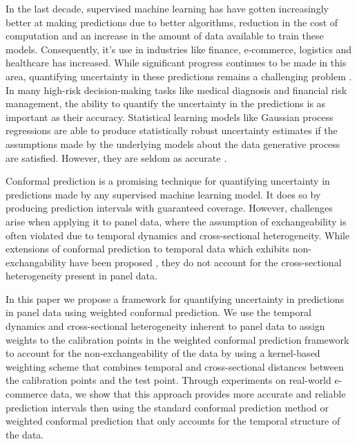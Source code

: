 
In the last decade, supervised machine learning has have gotten increasingly better at making predictions due to better algorithms, reduction in the cost of computation and an increase in the amount of data available to train these models. Consequently, it's use in industries like finance, e-commerce, logistics and healthcare has increased. While significant progress continues to be made in this area, quantifying uncertainty in these predictions remains a challenging problem \cite{abdar2021review, malinin2019uncertainty}. In many high-risk decision-making tasks like medical diagnosis and financial risk management, the ability to quantify the uncertainty in the predictions is as important as their accuracy. Statistical learning models like Gaussian process regressions \cite{schulz2018tutorial} are able to produce statistically robust uncertainty estimates if the assumptions made by the underlying models about the data generative process are satisfied. However, they are seldom as accurate \cite{breiman2001statistical}.

Conformal prediction \cite{vovk2022algorithmic} is a promising technique for quantifying uncertainty in predictions made by any supervised machine learning model. It does so by producing prediction intervals with guaranteed coverage. However, challenges arise when applying it to panel data, where the assumption of exchangeability is often violated due to temporal dynamics and cross-sectional heterogeneity. While extensions of conformal prediction to temporal data which exhibits non-exchangability have been proposed \cite{barber2022conformall}, they do not account for the cross-sectional heterogeneity present in panel data.

In this paper we propose a framework for quantifying uncertainty in predictions in panel data using weighted conformal prediction. We use the temporal dynamics and cross-sectional heterogeneity inherent to panel data to assign weights to the calibration points in the weighted conformal prediction framework to account for the non-exchangeability of the data by using a kernel-based weighting scheme that combines temporal and cross-sectional distances between the calibration points and the test point. Through experiments on real-world e-commerce data, we show that this approach provides more accurate and reliable prediction intervals then using the standard conformal prediction method or weighted conformal prediction that only accounts for the temporal structure of the data.

